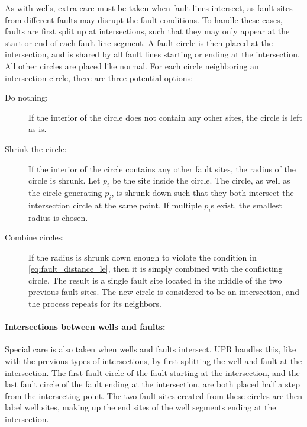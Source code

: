 As with wells, extra care must be taken when fault lines intersect, as fault sites from different faults may disrupt the fault conditions. To handle these cases, faults are first split up at intersections, such that they may only appear at the start or end of each fault line segment. A fault circle is then placed at the intersection, and is shared by all fault lines starting or ending at the intersection. All other circles are placed like normal. For each circle neighboring an intersection circle, there are three potential options:
\begin{description}
    \item[Do nothing:] If the interior of the circle does not contain any other sites, the circle is left as is.
    \item[Shrink the circle:] If the interior of the circle contains any other fault sites, the radius of the circle is shrunk. Let $p_i$ be the site inside the circle. The circle, as well as the circle generating $p_i$, is shrunk down such that they both intersect the intersection circle at the same point. If multiple $p_i$s exist, the smallest radius is chosen.
    \item[Combine circles:] If the radius is shrunk down enough to violate the condition in \autoref{eq:fault_distance_le}, then it is simply combined with the conflicting circle. The result is a single fault site located in the middle of the two previous fault sites. The new circle is considered to be an intersection, and the process repeats for its neighbors.
\end{description}

\paragraph{Intersections between wells and faults:}
\label{UPR:intersections}
Special care is also taken when wells and faults intersect. UPR handles this, like with the previous types of intersections, by first splitting the well and fault at the intersection. The first fault circle of the fault starting at the intersection, and the last fault circle of the fault ending at the intersection, are both placed half a step from the intersecting point. The two fault sites created from these circles are then label well sites, making up the end sites of the well segments ending at the intersection.

